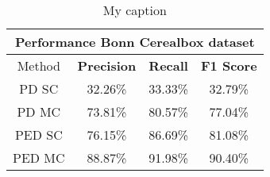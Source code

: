 \begin{table}[H]
\centering
\begin{tabular}{|c|c|c|c|}
\hline
\multicolumn{4}{|c|}{Performance Bonn Cerealbox dataset}                        \\ \hline
Method & \textbf{Precision} & \textbf{Recall} & \textbf{F1 Score} \\ \hline
PD SC & 32.26\%   & 33.33\%     & 32.79\%  \\ \hline
PD MC & 73.81\%   & 80.57\%     & 77.04\%  \\ \hline 
PED SC & 76.15\%   & 86.69\%     & 81.08\%  \\ \hline
PED MC & 88.87\%   & 91.98\%     & 90.40\%  \\ \hline               
\end{tabular}
\caption[Cars Varying $\lambda$]{My caption}
\label{tab:bonn_cerealbox_performance}
\end{table}









